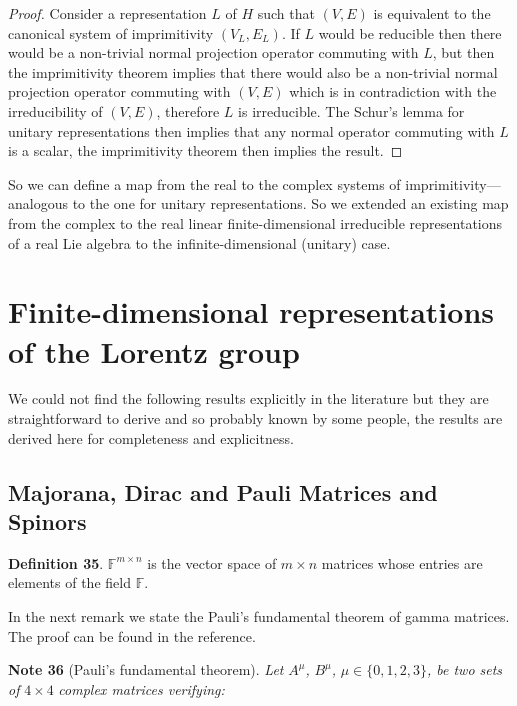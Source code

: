 \documentclass[11pt]{book}
\begin{document}
\emph{Proof.} Consider a representation \(L\) of \(H\) such that
\((V, E)\) is equivalent to the canonical system of imprimitivity
\((V_L,E_L)\). If \(L\) would be reducible then there would be a
non-trivial normal projection operator commuting with \(L\), but then
the imprimitivity theorem implies that there would also be a non-trivial
normal projection operator commuting with \((V,E)\) which is in
contradiction with the irreducibility of \((V,E)\), therefore \(L\) is
irreducible. The Schur's lemma for unitary representations then implies
that any normal operator commuting with \(L\) is a scalar, the
imprimitivity theorem then implies the result.~◻

So we can define a map from the real to the complex systems of
imprimitivity---analogous to the one for unitary representations. So we
extended an existing map from the complex to the real linear
finite-dimensional irreducible representations of a real Lie
algebra\cite{Oniux161ux10dik2004Lectures}\cite{Iwahori1959On} to the
infinite-dimensional (unitary) case.

\hypertarget{section:Lorentz}{%
\section{Finite-dimensional representations of the Lorentz
group}\label{section:Lorentz}}

We could not find the following results explicitly in the literature but
they are straightforward to derive and so probably known by some people,
the results are derived here for completeness and explicitness.

\hypertarget{majorana-dirac-and-pauli-matrices-and-spinors}{%
\subsection{Majorana, Dirac and Pauli Matrices and
Spinors}\label{majorana-dirac-and-pauli-matrices-and-spinors}}

\textbf{Definition 35}. \(\mathbb{F}^{m\times n}\) is the vector space
of \(m\times n\) matrices whose entries are elements of the field
\(\mathbb{F}\).

In the next remark we state the Pauli's fundamental theorem of gamma
matrices. The proof can be found in the
reference\cite{Good1955Properties}.

\textbf{Note 36} (Pauli's fundamental theorem). \emph{Let
}\(A^\mu\)\emph{, }\(B^\mu\)\emph{, }\(\mu\in\{0,1,2,3\}\)\emph{, be two
sets of }\(4\times 4\)\emph{ complex matrices verifying: }
\end{document}
